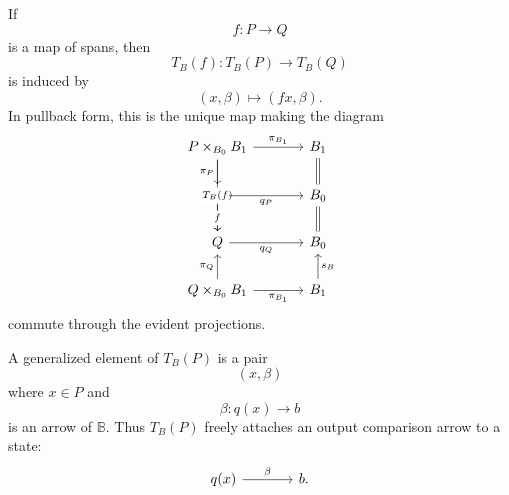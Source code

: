 \begin{definition}
    If
    \[
        f:P\to Q
    \]
    is a map of spans, then
    \[
        T_B(f):T_B(P)\to T_B(Q)
    \]
    is induced by
    \[
        (x,\beta)\longmapsto(fx,\beta).
    \]
    In pullback form, this is the unique map making the diagram
    \[
        \begin{tikzcd}[column sep=large]
                P\times_{B_0}B_1
                    \arrow[r, "\pi_{B_1}"]
                    \arrow[d, "\pi_P"']
                    \arrow[dd, "{T_B(f)}" description]
            &
                B_1 
                    \arrow[d, equal]
            \\
                P 
                    \arrow[r, "q_P"'] 
                    \arrow[d, "f" description]
            &
                B_0 
                    \arrow[d, equal]
            \\
                Q 
                    \arrow[r, "q_Q"']
            &
                B_0
            \\
                Q\times_{B_0}B_1
                    \arrow[u, "\pi_Q"]
                    \arrow[r, "\pi_{B_1}"']
            &
                B_1 
                    \arrow[u, "s_B"']
        \end{tikzcd}
    \]
    commute through the evident projections.
\end{definition}

A generalized element of \(T_B(P)\) is a pair
\[
    (x,\beta)
\]
where \(x\in P\) and
\[
    \beta:q(x)\to b
\]
is an arrow of \(\mathbb B\). Thus \(T_B(P)\) freely attaches an output comparison arrow to a state:
\[
    \begin{tikzcd}[column sep=large]
            q(x) 
                \arrow[r, "\beta"] 
        & 
            b.
    \end{tikzcd}
\]

